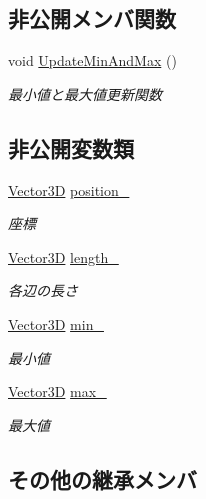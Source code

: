 \subsection*{非公開メンバ関数}
\begin{DoxyCompactItemize}
\item 
void \mbox{\hyperlink{class_a_a_b_b_aad10f509f6726aed8285063a69df9085}{Update\+Min\+And\+Max}} ()
\begin{DoxyCompactList}\small\item\em 最小値と最大値更新関数 \end{DoxyCompactList}\end{DoxyCompactItemize}
\subsection*{非公開変数類}
\begin{DoxyCompactItemize}
\item 
\mbox{\hyperlink{class_vector3_d}{Vector3D}} \mbox{\hyperlink{class_a_a_b_b_a3ca25dc046fa31d1baafa8c8a1174302}{position\+\_\+}}
\begin{DoxyCompactList}\small\item\em 座標 \end{DoxyCompactList}\item 
\mbox{\hyperlink{class_vector3_d}{Vector3D}} \mbox{\hyperlink{class_a_a_b_b_abade307dbbfa9c74638fde5387d629f8}{length\+\_\+}}
\begin{DoxyCompactList}\small\item\em 各辺の長さ \end{DoxyCompactList}\item 
\mbox{\hyperlink{class_vector3_d}{Vector3D}} \mbox{\hyperlink{class_a_a_b_b_a682f7bc02fc950a24ce8a8e512e4eb52}{min\+\_\+}}
\begin{DoxyCompactList}\small\item\em 最小値 \end{DoxyCompactList}\item 
\mbox{\hyperlink{class_vector3_d}{Vector3D}} \mbox{\hyperlink{class_a_a_b_b_a7f8dca79cab056729bde7139b219fcbe}{max\+\_\+}}
\begin{DoxyCompactList}\small\item\em 最大値 \end{DoxyCompactList}\end{DoxyCompactItemize}
\subsection*{その他の継承メンバ}



